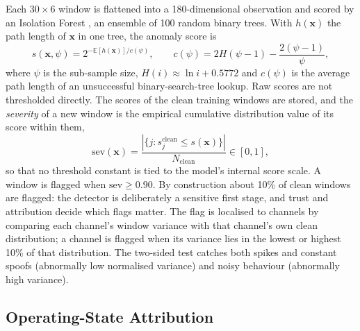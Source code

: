 \documentclass[11pt,a4paper]{article}
\begin{document}
Each $30 \times 6$ window is flattened into a 180-dimensional observation and scored by an Isolation Forest \cite{liu2008iforest}, an ensemble of 100 random binary trees. With $h(\mathbf{x})$ the path length of $\mathbf{x}$ in one tree, the anomaly score is
\begin{equation}
s(\mathbf{x}, \psi) = 2^{-\mathbb{E}[h(\mathbf{x})]/c(\psi)}, \qquad c(\psi) = 2H(\psi-1) - \frac{2(\psi-1)}{\psi},
\end{equation}
where $\psi$ is the sub-sample size, $H(i) \approx \ln i + 0.5772$ and $c(\psi)$ is the average path length of an unsuccessful binary-search-tree lookup. Raw scores are not thresholded directly. The scores of the clean training windows are stored, and the \emph{severity} of a new window is the empirical cumulative distribution value of its score within them,
\begin{equation}
\mathrm{sev}(\mathbf{x}) = \frac{\left|\{ j : s_j^{\mathrm{clean}} \leq s(\mathbf{x}) \}\right|}{N_{\mathrm{clean}}} \in [0,1],
\end{equation}
so that no threshold constant is tied to the model's internal score scale. A window is flagged when $\mathrm{sev} \geq 0.90$. By construction about 10\% of clean windows are flagged: the detector is deliberately a sensitive first stage, and trust and attribution decide which flags matter. The flag is localised to channels by comparing each channel's window variance with that channel's own clean distribution; a channel is flagged when its variance lies in the lowest or highest 10\% of that distribution. The two-sided test catches both spikes and constant spoofs (abnormally low normalised variance) and noisy behaviour (abnormally high variance).

\subsection{Operating-State Attribution}
\label{sec:attribution}
\end{document}
